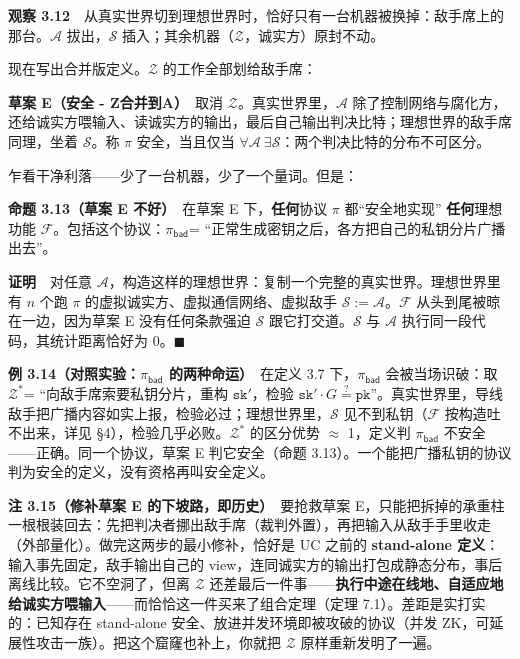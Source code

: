 \textbf{观察
3.12}　从真实世界切到理想世界时，恰好只有一台机器被换掉：敌手席上的那台。$\mathcal{A}$ 拔出，$\mathcal{S}$ 插入；其余机器（$\mathcal{Z}$，诚实方）原封不动。

现在写出合并版定义。$\mathcal{Z}$ 的工作全部划给敌手席：

\textbf{草案 E（安全 -
Z合并到A）}　取消 $\mathcal{Z}$。真实世界里，$\mathcal{A}$ 除了控制网络与腐化方，还给诚实方喂输入、读诚实方的输出，最后自己输出判决比特；理想世界的敌手席同理，坐着 $\mathcal{S}$。称 $\pi$ 安全，当且仅当 $\forall \mathcal{A}\ \exists \mathcal{S}$：两个判决比特的分布不可区分。

乍看干净利落------少了一台机器，少了一个量词。但是：

\textbf{命题 3.13（草案 E 不好）}　在草案 E
下，\textbf{任何}协议 $\pi$ 都“安全地实现”
\textbf{任何}理想功能 $\mathcal{F}$。包括这个协议：$\pi_{\mathsf{bad}}$=
“正常生成密钥之后，各方把自己的私钥分片广播出去”。

\textbf{证明}　对任意 $\mathcal{A}$，构造这样的理想世界：复制一个完整的真实世界。理想世界里有 $n$ 个跑 $\pi$ 的虚拟诚实方、虚拟通信网络、虚拟敌手 $\mathcal{S}:=\mathcal{A}$。$\mathcal{F}$ 从头到尾被晾在一边，因为草案
E
没有任何条款强迫 $\mathcal{S}$ 跟它打交道。$\mathcal{S}$ 与 $\mathcal{A}$ 执行同一段代码，其统计距离恰好为
0。$\blacksquare$

\textbf{例 3.14（对照实验：$\pi_{\mathsf{bad}}$ 的两种命运）}　在定义
3.7 下，$\pi_{\mathsf{bad}}$ 会被当场识破：取 $\mathcal{Z}^*$=
“向敌手席索要私钥分片，重构 $\mathtt{sk}'$，检验 $\mathtt{sk}' \cdot G \stackrel{?}{=} \mathtt{pk}$”。真实世界里，导线敌手把广播内容如实上报，检验必过；理想世界里，$\mathcal{S}$ 见不到私钥（$\mathcal{F}$ 按构造吐不出来，详见
§4），检验几乎必败。$\mathcal{Z}^*$ 的区分优势 $\approx$
1，定义判 $\pi_{\mathsf{bad}}$ 不安全------正确。同一个协议，草案 E
判它安全（命题
3.13）。一个能把广播私钥的协议判为安全的定义，没有资格再叫安全定义。

\textbf{注 3.15（修补草案 E 的下坡路，即历史）}　要抢救草案
E，只能把拆掉的承重柱一根根装回去：先把判决者挪出敌手席（裁判外置），再把输入从敌手手里收走（外部量化）。做完这两步的最小修补，恰好是
UC 之前的 \textbf{stand-alone 定义}：输入事先固定，敌手输出自己的
view，连同诚实方的输出打包成静态分布，事后离线比较。它不空洞了，但离 $\mathcal{Z}$ 还差最后一件事------\textbf{执行中途在线地、自适应地给诚实方喂输入}------而恰恰这一件买来了组合定理（定理
7.1）。差距是实打实的：已知存在 stand-alone
安全、放进并发环境即被攻破的协议（并发
ZK，可延展性攻击一族）。把这个窟窿也补上，你就把 $\mathcal{Z}$ 原样重新发明了一遍。

